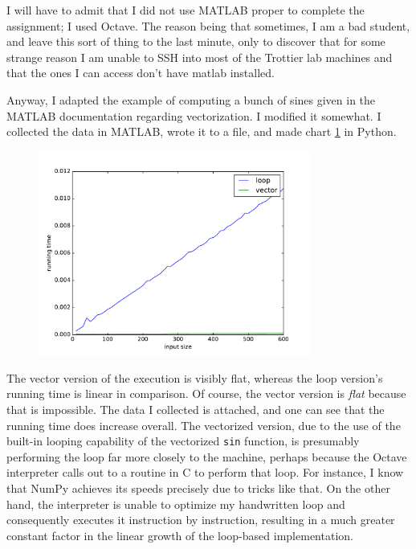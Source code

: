 \documentclass[letterpaper,11pt]{article}
\begin{document}
I will have to admit that I did not use MATLAB proper to complete the
assignment; I used Octave. The reason being that sometimes, I am a bad student,
and leave this sort of thing to the last minute, only to discover that for some
strange reason I am unable to SSH into most of the Trottier lab machines and
that the ones I can access don't have matlab installed.

Anyway, I adapted the example of computing a bunch of sines given in the MATLAB
documentation regarding vectorization. I modified it somewhat. I collected the
data in MATLAB, wrote it to a file, and made chart \ref{fig:data} in Python.

\begin{figure}[ht]
    \centering
    \includegraphics[width=0.8\textwidth]{fig.pdf}
    \label{fig:data}
\end{figure}

The vector version of the execution is visibly flat, whereas the loop
version's running time is linear in comparison. Of course, the vector version
is \emph{flat} because that is impossible. The data I collected is attached,
and one can see that the running time does increase overall. The vectorized
version, due to the use of the built-in looping capability of the vectorized
\texttt{sin} function, is presumably performing the loop far more closely to
the machine, perhaps because the Octave interpreter calls out to a routine in C
to perform that loop. For instance, I know that NumPy achieves its speeds
precisely due to tricks like that. On the other hand, the interpreter is unable
to optimize my handwritten loop and consequently executes it instruction by
instruction, resulting in a much greater constant factor in the linear growth
of the loop-based implementation.
\end{document}
